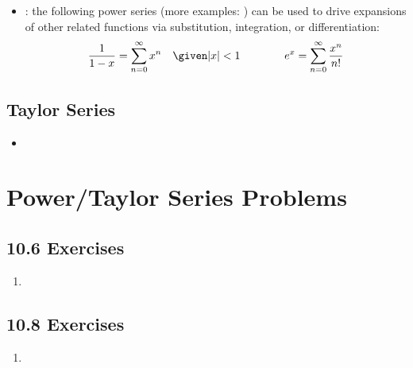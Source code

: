 \begin{itemize}
\begin{itemize}
      \item {}: the following power series
        (more examples: ) can be used to drive
        expansions of other related functions via substitution, integration, or
        differentiation:
        \[%
          \frac{1}{1-x} = \sum_{n=0}^{\infty} x^n \quad \given |x| < 1
          \qquad \qquad
          e^x = \sum_{n=0}^{\infty} \frac{x^n}{n!}
        \]%

    \end{itemize}
\end{itemize}


\newpage %

\subsection{Taylor Series}
\begin{itemize}
  \item

\end{itemize}

\section{Power/Taylor Series Problems}

\subsection{10.6 Exercises}
\begin{enumerate}[itemsep=3em]
  \item

\end{enumerate}

\subsection{10.8 Exercises}
\begin{enumerate}[itemsep=3em]
  \item
\end{enumerate}
